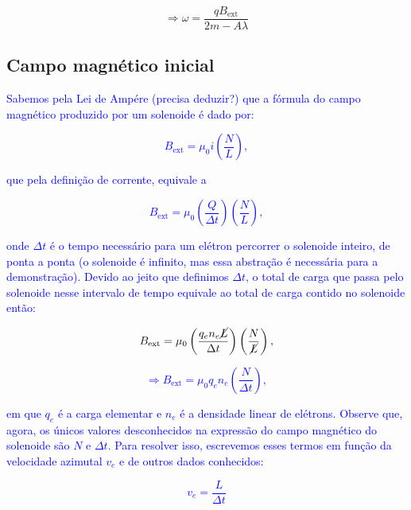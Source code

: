 \documentclass[
	article,
	11pt,
	oneside,
	a4paper,
	english,
	brazil,
	sumario=tradicional
	]{abntex2}
\begin{document}
\begin{equation}
    \Rightarrow \boxed{\omega = \frac{qB_{\text{ext}}}{2m - A\lambda}}
\end{equation}

\subsection{Campo magnético inicial}

\textcolor{blue}{Sabemos pela Lei de Ampére (precisa deduzir?) que a fórmula do campo magnético produzido por um solenoide é dado por:}


\textcolor{blue}{\begin{equation}
    B_{\text{ext}} = \mu_0 i \left(\frac{N}{L}\right),
\end{equation}}

\noindent\textcolor{blue}{que pela definição de corrente, equivale a}

\textcolor{blue}{\begin{equation}
    B_{\text{ext}} = \mu_0 \left(\frac{Q}{\Delta t}\right) \left(\frac{N}{L}\right),
\end{equation}}

\noindent\textcolor{blue}{onde $\Delta t$ é o tempo necessário para um elétron percorrer o solenoide inteiro, de ponta a ponta (o solenoide é infinito, mas essa abstração é necessária para a demonstração). Devido ao jeito que definimos $\Delta t$, o total de carga que passa pelo solenoide nesse intervalo de tempo equivale ao total de carga contido no solenoide então:}

\textcolor{blue}{\begin{equation}
    B_{\text{ext}} = \mu_0 \left(\frac{q_e n_e \cancel{L}}{\Delta t}\right) \left(\frac{N}{\cancel{L}}\right),
\end{equation}}

\textcolor{blue}{\begin{equation}
    \Rightarrow B_{\text{ext}} = \mu_0 q_e n_e \left(\frac{N}{\Delta t}\right),
\end{equation}}

\noindent\textcolor{blue}{em que $q_e$ é a carga elementar e $n_e$ é a densidade linear de elétrons. Observe que, agora, os únicos valores desconhecidos na expressão do campo magnético do solenoide são $N$ e $\Delta t$. Para resolver isso, escrevemos esses termos em função da velocidade azimutal $v_e$ e de outros dados conhecidos:}

\textcolor{blue}{\begin{equation}
    v_e = \frac{L}{\Delta t}
\end{equation}}
\end{document}
